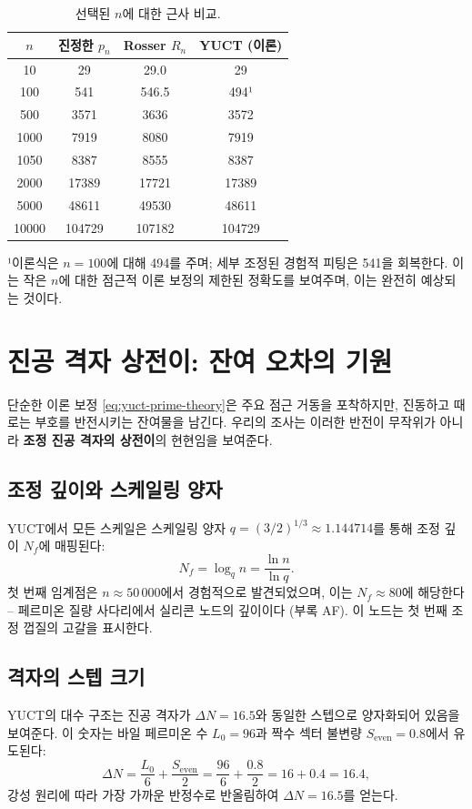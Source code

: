 \documentclass[11pt,a4paper]{article}
\newcommand{\Seven}{S_{\mathrm{even}}}
\begin{document}
	\begin{table}[htbp]
		\centering
		\caption{선택된 \(n\)에 대한 근사 비교.}
		\label{tab:comparison}
		\small
		\begin{tabular}{c c c c}
			\toprule
			$n$ & 진정한 $p_n$ & Rosser $R_n$ & YUCT (이론) \\
			\midrule
			10   & 29      & 29.0  & 29  \\
			100  & 541     & 546.5 & 494¹ \\
			500  & 3571    & 3636  & 3572 \\
			1000 & 7919    & 8080  & 7919 \\
			1050 & 8387    & 8555  & 8387 \\
			2000 & 17389   & 17721 & 17389\\
			5000 & 48611   & 49530 & 48611\\
			10000& 104729  & 107182& 104729\\
			\bottomrule
		\end{tabular}
		\par\smallskip
		\footnotesize
		¹이론식은 \(n=100\)에 대해 494를 주며; 세부 조정된 경험적 피팅은 541을 회복한다. 이는 작은 \(n\)에 대한 점근적 이론 보정의 제한된 정확도를 보여주며, 이는 완전히 예상되는 것이다.
	\end{table}
	
	\section{진공 격자 상전이: 잔여 오차의 기원}
	\label{sec:phasetrans}
	단순한 이론 보정 \eqref{eq:yuct-prime-theory}은 주요 점근 거동을 포착하지만, 진동하고 때로는 부호를 반전시키는 잔여물을 남긴다. 우리의 조사는 이러한 반전이 무작위가 아니라 \textbf{조정 진공 격자의 상전이}의 현현임을 보여준다.
	
	\subsection{조정 깊이와 스케일링 양자}
	YUCT에서 모든 스케일은 스케일링 양자 \(q = (3/2)^{1/3} \approx 1.144714\)를 통해 조정 깊이 \(N_f\)에 매핑된다:
	\[
	N_f = \log_q n = \frac{\ln n}{\ln q}.
	\]
	첫 번째 임계점은 \(n \approx 50\,000\)에서 경험적으로 발견되었으며, 이는 \(N_f \approx 80\)에 해당한다 – 페르미온 질량 사다리에서 실리콘 노드의 깊이이다 (부록 AF). 이 노드는 첫 번째 조정 껍질의 고갈을 표시한다.
	
	\subsection{격자의 스텝 크기}
	YUCT의 대수 구조는 진공 격자가 \(\Delta N = 16.5\)와 동일한 스텝으로 양자화되어 있음을 보여준다. 이 숫자는 바일 페르미온 수 \(L_0 = 96\)과 짝수 섹터 불변량 \(\Seven = 0.8\)에서 유도된다:
	\[
	\Delta N = \frac{L_0}{6} + \frac{\Seven}{2} = \frac{96}{6} + \frac{0.8}{2} = 16 + 0.4 = 16.4,
	\]
	강성 원리에 따라 가장 가까운 반정수로 반올림하여 \(\Delta N = 16.5\)를 얻는다.
	
\end{document}
